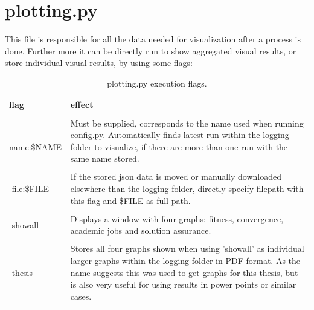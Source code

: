 \documentclass[a4paper,english]{report}
\begin{document}
\section{plotting.py}
\label{sec:plotting}
This file is responsible for all the data needed for visualization after a process is done. Further more it can be directly run to show aggregated visual results, or store individual visual results, by using some flags:
\begin{table}[H]
	\centering
	\caption{plotting.py execution flags.}
	\label{table:config_flags2}
	\begin{tabular}{p{4cm}p{7cm}}
		\\
		\multicolumn{1}{l}{\bfseries flag} & \multicolumn{1}{l}{\bfseries effect} \\ \hline \\
		-name:\$NAME& Must be supplied, corresponds to the name used when running config.py. Automatically finds latest run within the logging folder to visualize, if there are more than one run with the same name stored. \\
		\\
		-file:\$FILE & If the stored json data is moved or manually downloaded elsewhere than the logging folder, directly specify filepath with this flag and \$FILE as full path. \\
		\\
		-showall & Displays a window with four graphs: fitness, convergence, academic jobs and solution assurance.  \\
		\\
		-thesis & Stores all four graphs shown when using 'showall' as individual larger graphs within the logging folder in PDF format. As the name suggests this was used to get graphs for this thesis, but is also very useful for using results in power points or similar cases. \\
	\end{tabular}

\end{table}
\end{document}
